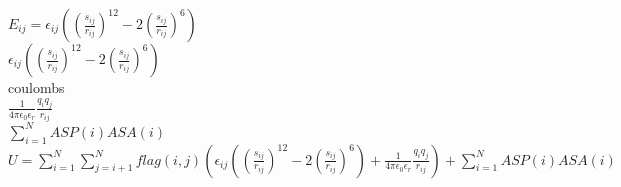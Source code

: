 \documentclass{article}
\begin{document}
\changefontsizes{10pt}
$E_{ij}=\epsilon_{ij}\left(\left(\frac{s_{ij}}{r_{ij}}\right)^{12}-2\left(\frac{s_{ij}}{r_{ij}}\right)^{6}\right)$ \\

$\epsilon_{ij}\left(\left(\frac{s_{ij}}{r_{ij}}\right)^{12}-2\left(\frac{s_{ij}}{r_{ij}}\right)^{6}\right)$ \\

coulombs \\
$\frac{1}{4\pi\epsilon_{0}\epsilon_{r}}\frac{q_{i}q_{j}}{r_{ij}}$ \\

$ \sum_{i=1}^{N} ASP(i)ASA(i)$ \\

$U = \sum_{i=1}^{N} \sum_{j=i+1}^{N} flag(i,j)
\left(\epsilon_{ij}\left(\left(\frac{s_{ij}}{r_{ij}}\right)^{12}-2\left(\frac{s_{ij}}{r_{ij}}\right)^{6}\right)+\frac{1}{4\pi\epsilon_{0}\epsilon_{r}}\frac{q_{i}q_{j}}{r_{ij}}\right)+
\sum_{i=1}^{N} ASP(i)ASA(i)$
\end{document}
